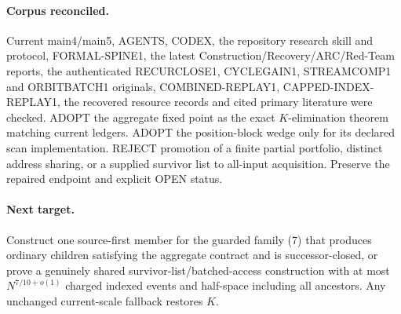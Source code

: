\documentclass[11pt]{article}
\begin{document}
\paragraph{Corpus reconciled.}
Current main4/main5, AGENTS, CODEX, the repository research skill and
protocol, FORMAL-SPINE1, the latest Construction/Recovery/ARC/Red-Team
reports, the authenticated RECURCLOSE1, CYCLEGAIN1, STREAMCOMP1 and
ORBITBATCH1 originals, COMBINED-REPLAY1, CAPPED-INDEX-REPLAY1, the recovered
resource records and cited primary literature were checked.  ADOPT the
aggregate fixed point as the exact $K$-elimination theorem matching current
ledgers.  ADOPT the position-block wedge only for its declared scan
implementation.  REJECT promotion of a finite partial portfolio, distinct
address sharing, or a supplied survivor list to all-input acquisition.
Preserve the repaired endpoint and explicit OPEN status.

\paragraph{Next target.}
Construct one source-first member for the guarded family (7) that produces
ordinary children satisfying the aggregate contract and is successor-closed,
or prove a genuinely shared survivor-list/batched-access construction with at
most $N^{7/10+o(1)}$ charged indexed events and half-space including all
ancestors.  Any unchanged current-scale fallback restores $K$.

\end{document}
